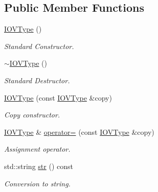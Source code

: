 \subsection*{Public Member Functions}
\begin{DoxyCompactItemize}
\item 
\hyperlink{class_d_d4hep_1_1_i_o_v_type_aa45116fda61d8214bcf0f83dcac1e9f6}{IOVType} ()
\begin{DoxyCompactList}\small\item\em Standard Constructor. \item\end{DoxyCompactList}\item 
\hyperlink{class_d_d4hep_1_1_i_o_v_type_a2ae28974fb8464c5e34b158e92efb728}{$\sim$IOVType} ()
\begin{DoxyCompactList}\small\item\em Standard Destructor. \item\end{DoxyCompactList}\item 
\hyperlink{class_d_d4hep_1_1_i_o_v_type_a89eb725303b66a7a2a3b2198f96a4913}{IOVType} (const \hyperlink{class_d_d4hep_1_1_i_o_v_type}{IOVType} \&copy)
\begin{DoxyCompactList}\small\item\em Copy constructor. \item\end{DoxyCompactList}\item 
\hyperlink{class_d_d4hep_1_1_i_o_v_type}{IOVType} \& \hyperlink{class_d_d4hep_1_1_i_o_v_type_a7c7f28fc3cd9f5f32ba33cdd5c12a43a}{operator=} (const \hyperlink{class_d_d4hep_1_1_i_o_v_type}{IOVType} \&copy)
\begin{DoxyCompactList}\small\item\em Assignment operator. \item\end{DoxyCompactList}\item 
std::string \hyperlink{class_d_d4hep_1_1_i_o_v_type_a54ef1c5550df3ff0d35f9daaf5262e50}{str} () const 
\begin{DoxyCompactList}\small\item\em Conversion to string. \item\end{DoxyCompactList}\end{DoxyCompactItemize}
